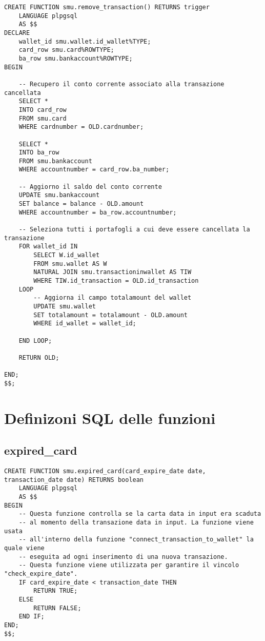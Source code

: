 \begin{lstlisting}[tabsize=2]
    CREATE FUNCTION smu.remove_transaction() RETURNS trigger
    LANGUAGE plpgsql
    AS $$
DECLARE
    wallet_id smu.wallet.id_wallet%TYPE;
    card_row smu.card%ROWTYPE;
    ba_row smu.bankaccount%ROWTYPE;
BEGIN

    -- Recupero il conto corrente associato alla transazione cancellata
    SELECT *
    INTO card_row
    FROM smu.card
    WHERE cardnumber = OLD.cardnumber;

    SELECT *
    INTO ba_row
    FROM smu.bankaccount
    WHERE accountnumber = card_row.ba_number;

    -- Aggiorno il saldo del conto corrente
    UPDATE smu.bankaccount
    SET balance = balance - OLD.amount
    WHERE accountnumber = ba_row.accountnumber;

    -- Seleziona tutti i portafogli a cui deve essere cancellata la transazione
    FOR wallet_id IN
        SELECT W.id_wallet
        FROM smu.wallet AS W
        NATURAL JOIN smu.transactioninwallet AS TIW 
        WHERE TIW.id_transaction = OLD.id_transaction
    LOOP
        -- Aggiorna il campo totalamount del wallet
        UPDATE smu.wallet
        SET totalamount = totalamount - OLD.amount
        WHERE id_wallet = wallet_id;

    END LOOP;

    RETURN OLD;
	
END;
$$;

\end{lstlisting}

\section{Definizoni SQL delle funzioni}

\subsection{expired\_card}

\begin{lstlisting}[tabsize=2]
    CREATE FUNCTION smu.expired_card(card_expire_date date, transaction_date date) RETURNS boolean
    LANGUAGE plpgsql
    AS $$
BEGIN
    -- Questa funzione controlla se la carta data in input era scaduta
    -- al momento della transazione data in input. La funzione viene usata
    -- all'interno della funzione "connect_transaction_to_wallet" la quale viene
    -- eseguita ad ogni inserimento di una nuova transazione.
    -- Questa funzione viene utilizzata per garantire il vincolo "check_expire_date".
    IF card_expire_date < transaction_date THEN
        RETURN TRUE;
    ELSE
        RETURN FALSE;
    END IF;
END;
$$;
\end{lstlisting}